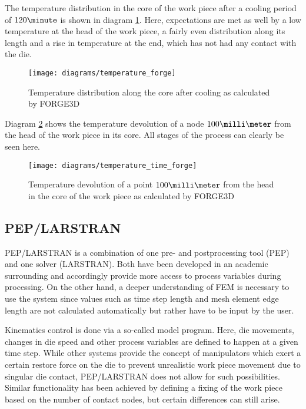 The temperature distribution in the core of the work piece after a cooling period of $120\minute$ is shown in diagram \ref{img:temp_forge}. Here, expectations are met as well by a low temperature at the head of the work piece, a fairly even distribution along its length and a rise in temperature at the end, which has not had any contact with the die.

\begin{figure}[tb]
  \centering
  \texttt{[image: diagrams/temperature\_forge]}
  \caption{Temperature distribution along the core after cooling as calculated by FORGE3D}
  \label{img:temp_forge}
\end{figure}

Diagram \ref{img:temp_time_forge} shows the temperature devolution of a node $100\milli\meter$ from the head of the work piece in its core. All stages of the process can clearly be seen here.

\begin{figure}[tb]
  \centering
  \texttt{[image: diagrams/temperature\_time\_forge]}
  \caption{Temperature devolution of a point $100\milli\meter$ from the head in the core of the work piece as calculated by FORGE3D}
  \label{img:temp_time_forge}
\end{figure}


\subsection{PEP/LARSTRAN}

PEP/LARSTRAN is a combination of one pre- and postprocessing tool (PEP) and one solver (LARSTRAN). Both have been developed in an academic surrounding and accordingly provide more access to process variables during processing. On the other hand, a deeper understanding of FEM is necessary to use the system since values such as time step length and mesh element edge length are not calculated automatically but rather have to be input by the user.

Kinematics control is done via a so-called model program. Here, die movements, changes in die speed and other process variables are defined to happen at a given time step. While other systems provide the concept of manipulators which exert a certain restore force on the die to prevent unrealistic work piece movement due to singular die contact, PEP/LARSTRAN does not allow for such possibilities. Similar functionality has been achieved by defining a fixing of the work piece based on the number of contact nodes, but certain differences can still arise.

